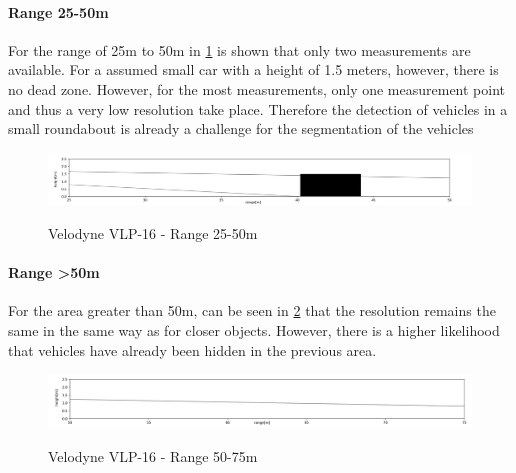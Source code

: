 \documentclass[11pt,oneside,openright]{mpreport}
\begin{document}
\paragraph{Range 25-50m}

For the range of 25m to 50m in \cref{velodyne_range_50} is shown that only two measurements are available. For a assumed small car with a height of 1.5 meters,
however, there is no dead zone. However, for the most measurements, only one measurement point and thus a very low resolution take place.
Therefore the detection of vehicles in a small roundabout is already a challenge for the segmentation of the vehicles

\begin{figure}[!ht]
\caption{Velodyne VLP-16 - Range 25-50m}
\includegraphics[width=\textwidth]{bilder/range_50.png}
\label{velodyne_range_50}
\end{figure}

\paragraph{Range >50m}

For the area greater than 50m, can be seen in \cref{velodyne_range_75} that the resolution remains the same in the same way as for closer objects.
However, there is a higher likelihood that vehicles have already been hidden in the previous area.

\begin{figure}[!ht]
\caption{Velodyne VLP-16 - Range 50-75m}
\includegraphics[width=\textwidth]{bilder/range_75.png}
\label{velodyne_range_75}
\end{figure}
\end{document}
